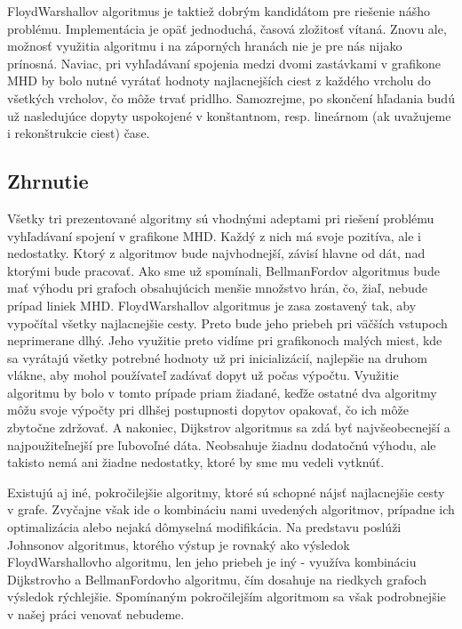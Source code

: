 Floyd\textendash Warshallov algoritmus je taktiež dobrým kandidátom pre riešenie nášho problému. Implementácia je opäť jednoduchá, časová zložitosť vítaná. Znovu ale, možnosť využitia algoritmu i na záporných hranách nie je pre nás nijako prínosná. Naviac, pri vyhľadávaní spojenia medzi dvomi zastávkami v grafikone MHD by bolo nutné vyrátať hodnoty najlacnejších ciest z každého vrcholu do všetkých vrcholov, čo môže trvať pridlho. Samozrejme, po skončení hľadania budú už nasledujúce dopyty uspokojené v konštantnom, resp. lineárnom (ak uvažujeme i rekonštrukcie ciest) čase.\newline


\subsection{Zhrnutie}
\label{vyhlad_alg_zhrnutie}

Všetky tri prezentované algoritmy sú vhodnými adeptami pri riešení problému vyhľadávaní spojení v grafikone MHD. Každý z nich má svoje pozitíva, ale i nedostatky. Ktorý z algoritmov bude najvhodnejší, závisí hlavne od dát, nad ktorými bude pracovať. Ako sme už spomínali, Bellman\textendash Fordov algoritmus bude mať výhodu pri grafoch obsahujúcich menšie množstvo hrán, čo, žiaľ, nebude prípad liniek MHD. Floyd\textendash Warshallov algoritmus je zasa zostavený tak, aby vypočítal všetky najlacnejšie cesty. Preto bude jeho priebeh pri väčších vstupoch neprimerane dlhý. Jeho využitie preto vidíme pri grafikonoch malých miest, kde sa vyrátajú všetky potrebné hodnoty už pri inicializácií, najlepšie na druhom vlákne, aby mohol používateľ zadávať dopyt už počas výpočtu. Využitie algoritmu by bolo v tomto prípade priam žiadané, keďže ostatné dva algoritmy môžu svoje výpočty pri dlhšej postupnosti dopytov opakovať, čo ich môže zbytočne zdržovať. A nakoniec, Dijkstrov algoritmus sa zdá byť najvšeobecnejší a najpoužiteľnejší pre ľubovoľné dáta. Neobsahuje žiadnu dodatočnú výhodu, ale takisto nemá ani žiadne nedostatky, ktoré by sme mu vedeli vytknúť.\newline

Existujú aj iné, pokročilejšie algoritmy, ktoré sú schopné nájsť najlacnejšie cesty v grafe. Zvyčajne však ide o kombináciu nami uvedených algoritmov, prípadne ich optimalizácia alebo nejaká dômyselná modifikácia. Na predstavu poslúži Johnsonov algoritmus, ktorého výstup je rovnaký ako výsledok Floyd\textendash Warshallovho algoritmu, len jeho priebeh je iný - využíva kombináciu Dijkstrovho a Bellman\textendash Fordovho algoritmu, čím dosahuje na riedkych grafoch výsledok rýchlejšie. Spomínaným pokročilejším algoritmom sa však podrobnejšie v našej práci venovať nebudeme.\newline


